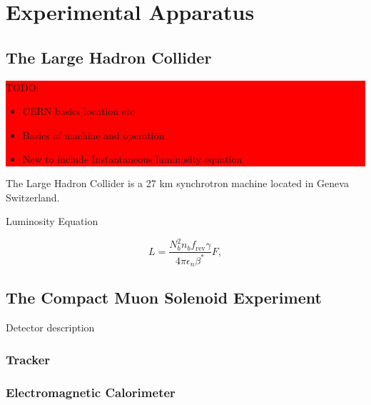 \chapter{Experimental Apparatus}
\label{CHAPTER:ExperimentalApparatus}

%

\section{The Large Hadron Collider}
\label{SECTION:ExperimentalApparatus_LHC}

\colorbox{red}{
\begin{minipage}{\linewidth}
TODO: 

\begin{itemize}
  \item CERN basics location etc
  \item Basics of machine and operation
  \item New to include Instantaneous luminosity equation
\end{itemize}

\end{minipage}
}

The Large Hadron Collider \cite{ARTICLE:LHCMachine} is a 27 km synchrotron machine located in Geneva Switzerland.

Luminosity Equation

\begin{equation}
L=\frac{N_{b}^{2}n_{b}f_{\text{rev}}\gamma}{4\pi\epsilon_{n}\beta^{*}}F,
\end{equation}

\section{The Compact Muon Solenoid Experiment}
\label{SECTION:ExperimentalApparatus_CMS}

Detector description

\subsection{Tracker}
\label{SUBSECTION:ExperimentalApparatus_CMS_Tracker}

\subsection{Electromagnetic Calorimeter}
\label{SUBSECTION:ExperimentalApparatus_CMS_ECAL}

